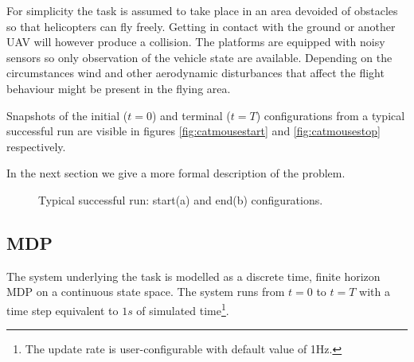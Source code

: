 \documentclass[a4paper,11pt]{report}
\begin{document}
For simplicity the task is assumed to take place in an area devoided of obstacles so that helicopters can fly freely. Getting in contact with the ground or another UAV will however produce a collision.
The platforms are equipped with noisy sensors so only observation of the vehicle state are available.  
Depending on the circumstances wind and other aerodynamic disturbances that affect the flight behaviour might be present in the flying area.

Snapshots of the initial ($t=0$) and terminal ($t=T$) configurations from a typical successful run are visible in figures \ref{fig:catmousestart} and \ref{fig:catmousestop} respectively. 

In the next section we give a more formal description of the problem.

\begin{figure}[ht]
\centering
{}
\caption{Typical successful run: start(a) and end(b) configurations. \label{fig:catmouse}}
\end{figure}

\subsection{MDP}

The system underlying the task is modelled as a discrete time, finite horizon MDP on a continuous state space. The system runs from $t=0$ to $t=T$ with a time step equivalent to $1s$ of simulated time\footnote{The update rate is user-configurable with default value of 1Hz.}. 
\end{document}
